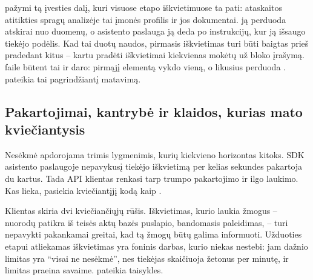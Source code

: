  pažymi tą įvesties dalį, kuri visuose etapo iškvietimuose ta pati: ataskaitos
atitikties spragų analizėje tai įmonės profilis ir jos dokumentai.  ją
perduoda atskirai nuo duomenų, o asistento paslauga ją deda po instrukcijų, kur ją išsaugo
tiekėjo podėlis. Kad tai duotų naudos, pirmasis iškvietimas turi būti baigtas prieš pradedant
kitus -- kartu pradėti iškvietimai kiekvienas mokėtų už bloko įrašymą. 
faile  būtent tai ir daro: pirmąjį elementą vykdo vieną, o likusius
perduoda .  pateikia tai pagrindžiantį matavimą.

\subsection{Pakartojimai, kantrybė ir klaidos, kurias mato kviečiantysis}\label{sec:models:errors}

Nesėkmė apdorojama trimis lygmenimis, kurių kiekvieno horizontas kitoks. SDK asistento
paslaugoje nepavykusį tiekėjo iškvietimą per kelias sekundes pakartoja du kartus. Tada API
klientas renkasi tarp trumpo pakartojimo ir ilgo laukimo. Kas lieka, pasiekia kviečiantįjį
kodą kaip .

Klientas skiria dvi kviečiančiųjų rūšis. Iškvietimas, kurio laukia žmogus -- nuorodų patikra
iš teisės aktų bazės puslapio, bandomasis paleidimas, -- turi nepavykti pakankamai greitai,
kad tą žmogų būtų galima informuoti. Užduoties etapui atliekamas iškvietimas yra foninis
darbas, kurio niekas nestebi: jam dažnio limitas yra \enquote{visai ne nesėkmė}, nes tiekėjas
skaičiuoja žetonus per minutę, ir limitas praeina savaime.  pateikia
 taisykles.

